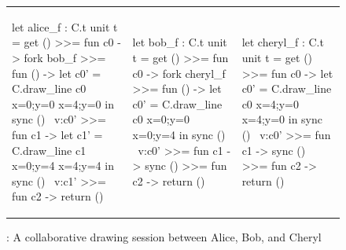 \begin{figure}
\centering
\begin{tabular}{l||l||l}
\begin{ocaml}
let alice_f : C.t unit t =
  get () >>= fun c0 ->
  fork bob_f >>= fun () ->
  let c0' = C.draw_line c0
    {x=0;y=0}
    {x=4;y=0} in
  sync () ~v:c0' >>=
  fun c1 ->
  let c1' = C.draw_line c1
    {x=0;y=4}
    {x=4;y=4} in
  sync () ~v:c1' >>=
  fun c2 -> return ()
\end{ocaml}
&
\begin{ocaml}
let bob_f : C.t unit t =
  get () >>= fun c0 ->
  fork cheryl_f >>=
  fun () ->
  let c0' = C.draw_line c0
    {x=0;y=0}
    {x=0;y=4} in
  sync () ~v:c0' >>=
  fun c1 -> sync () >>=
  fun c2 -> return ()
\end{ocaml}
&
\begin{ocaml}
let cheryl_f : C.t unit t =
  get () >>= fun c0 ->
  let c0' = C.draw_line c0
    {x=4;y=0}
    {x=4;y=0} in
  sync () ~v:c0' >>=
  fun c1 -> sync () >>=
  fun c2 -> return ()
\end{ocaml}
\\
\end{tabular}
\caption{\drawsome: A collaborative drawing session between Alice,
Bob, and Cheryl}
\label{fig:canvas-sessions-code}
\end{figure}

